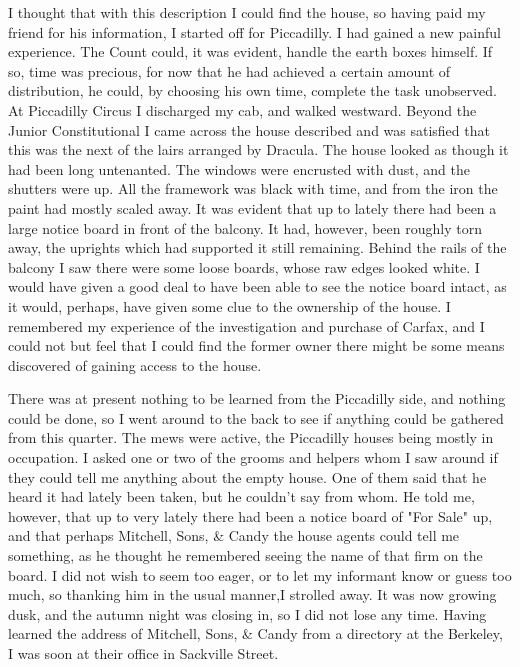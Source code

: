 I thought that with this description I could find the house, so having paid my friend for his information, I started off for Piccadilly. I had gained a new painful experience. The Count could, it was evident, handle the earth boxes himself. If so, time was precious, for now that he had achieved a certain amount of distribution, he could, by choosing his own time, complete the task unobserved. At Piccadilly Circus I discharged my cab, and walked westward. Beyond the Junior Constitutional I came across the house described and was satisfied that this was the next of the lairs arranged by Dracula. The house looked as though it had been long untenanted. The windows were encrusted with dust, and the shutters were up. All the framework was black with time, and from the iron the paint had mostly scaled away. It was evident that up to lately there had been a large notice board in front of the balcony. It had, however, been roughly torn away, the uprights which had supported it still remaining. Behind the rails of the balcony I saw there were some loose boards, whose raw edges looked white. I would have given a good deal to have been able to see the notice board intact, as it would, perhaps, have given some clue to the ownership of the house. I remembered my experience of the investigation and purchase of Carfax, and I could not but feel that I could find the former owner there might be some means discovered of gaining access to the house. 

There was at present nothing to be learned from the Piccadilly side, and nothing could be done, so I went around to the back to see if anything could be gathered from this quarter. The mews were active, the Piccadilly houses being mostly in occupation. I asked one or two of the grooms and helpers whom I saw around if they could tell me anything about the empty house. One of them said that he heard it had lately been taken, but he couldn't say from whom. He told me, however, that up to very lately there had been a notice board of "For Sale" up, and that perhaps Mitchell, Sons, \& Candy the house agents could tell me something, as he thought he remembered seeing the name of that firm on the board. I did not wish to seem too eager, or to let my informant know or guess too much, so thanking him in the usual manner,I strolled away. It was now growing dusk, and the autumn night was closing in, so I did not lose any time. Having learned the address of Mitchell, Sons, \& Candy from a directory at the Berkeley, I was soon at their office in Sackville Street. 

